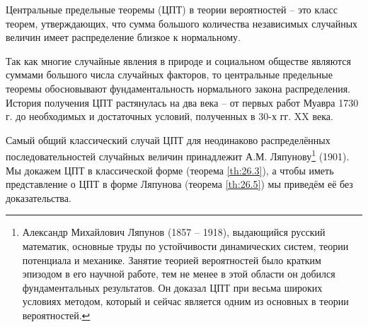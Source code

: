 

\begin{zam}
\label{zam:26.1}
Центральные предельные теоремы (ЦПТ) в теории вероятностей -- это класс теорем, утверждающих, что сумма большого количества независимых случайных величин имеет распределение близкое к нормальному. 

Так как многие случайные явления в природе и социальном обществе являются суммами большого числа случайных факторов, то центральные предельные теоремы обосновывают фундаментальность нормального закона распределения. История получения ЦПТ растянулась на два века -- от первых работ Муавра 1730 г. до необходимых и достаточных условий, полученных в 30-х гг. XX века. 

Самый общий классический случай ЦПТ для неодинаково распределённых последовательностей случайных величин принадлежит А.М. Ляпунову\footnote{Александр Михайлович Ляпунов (1857 -- 1918), выдающийся русский математик, основные труды
по устойчивости динамических систем, теории потенциала и механике. Занятие теорией вероятностей было кратким эпизодом в его научной работе, тем не менее в этой области он добился фундаментальных результатов. Он доказал ЦПТ при весьма широких условиях методом, который и сейчас является одним
из основных в теории вероятностей.} (1901). Мы докажем ЦПТ в классической форме (теорема \ref{th:26.3}), а чтобы иметь представление о ЦПТ в форме Ляпунова (теорема \ref{th:26.5}) мы приведём её без доказательства. 
\end{zam}

